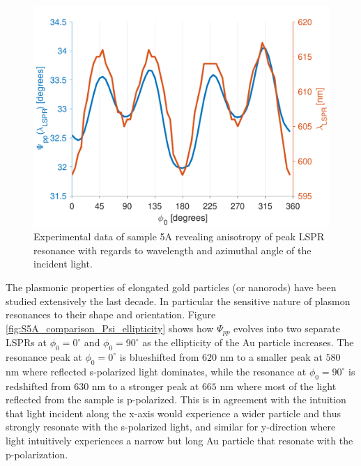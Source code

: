 \begin{figure}[h]
    \centering
    \includegraphics[width=0.5\linewidth]{figures/ch4/S5A/comparisons/S5Aexperimental_Psipp_at_LSPR.pdf}
    \caption{Experimental data of sample 5A revealing anisotropy of peak LSPR resonance with regards to wavelength and azimuthal angle of the incident light.}
    \label{fig:S5A_comparisons_Psipp@LSPR_expdata}
\end{figure}

The plasmonic properties of elongated gold particles (or nanorods) have been studied extensively the last decade\cite{Au_nanorods_review}\cite{LSPR_sensor_review}. In particular the sensitive nature of plasmon resonances to their shape and orientation\cite{multipolePlasmons_metalrods}. Figure \ref{fig:S5A_comparison_Psi_ellipticity} shows how $\Psi_{pp}$ evolves into two separate LSPRs at $\phi_0=0^\circ$ and $\phi_0=90^\circ$ as the ellipticity of the Au particle increases. The resonance peak at $\phi_0=0^\circ$ is blueshifted from $620$ nm to a smaller peak at $580$ nm where reflected s-polarized light dominates, while the resonance at $\phi_0=90^\circ$ is redshifted from $630$ nm to a stronger peak at $665$ nm where most of the light reflected from the sample is p-polarized. This is in agreement with the intuition that light incident along the x-axis would experience a wider particle and thus strongly resonate with the s-polarized light, and similar for y-direction where light intuitively experiences a narrow but long Au particle that resonate with the p-polarization.

